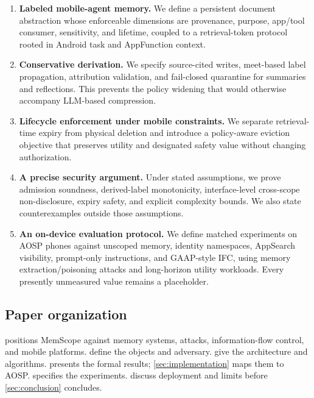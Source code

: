 \begin{enumerate}[leftmargin=*]
  \item \textbf{Labeled mobile-agent memory.} We define a persistent document abstraction whose enforceable dimensions are provenance, purpose, app/tool consumer, sensitivity, and lifetime, coupled to a retrieval-token protocol rooted in Android task and AppFunction context.
  \item \textbf{Conservative derivation.} We specify source-cited writes, meet-based label propagation, attribution validation, and fail-closed quarantine for summaries and reflections. This prevents the policy widening that would otherwise accompany LLM-based compression.
  \item \textbf{Lifecycle enforcement under mobile constraints.} We separate retrieval-time expiry from physical deletion and introduce a policy-aware eviction objective that preserves utility and designated safety value without changing authorization.
  \item \textbf{A precise security argument.} Under stated assumptions, we prove admission soundness, derived-label monotonicity, interface-level cross-scope non-disclosure, expiry safety, and explicit complexity bounds. We also state counterexamples outside those assumptions.
  \item \textbf{An on-device evaluation protocol.} We define matched experiments on AOSP phones against unscoped memory, identity namespaces, AppSearch visibility, prompt-only instructions, and GAAP-style IFC, using memory extraction/poisoning attacks and long-horizon utility workloads. Every presently unmeasured value remains a placeholder.
\end{enumerate}

\subsection{Paper organization}

 positions MemScope against memory systems, attacks, information-flow control, and mobile platforms.  define the objects and adversary.  give the architecture and algorithms.  presents the formal results; \cref{sec:implementation} maps them to AOSP.  specifies the experiments.  discuss deployment and limits before \cref{sec:conclusion} concludes.
